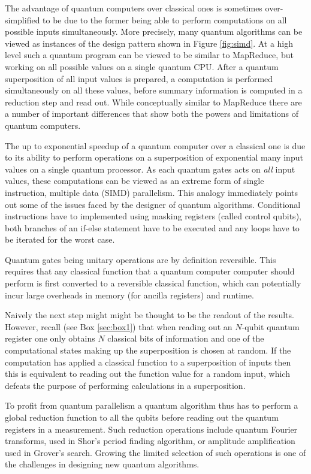 \documentclass[journal]{IEEEtran}
\begin{document}
The advantage of quantum computers over classical ones is sometimes over-simplified to be due to the former being able to perform computations on all possible inputs simultaneously. More precisely, many quantum algorithms can be viewed as instances of the design pattern shown in Figure \ref{fig:simd}. At a high level such a quantum program can be viewed to be similar to MapReduce, but working on all possible values on a single quantum CPU. After a quantum superposition of all input values is prepared, a computation is performed simultaneously on all these values, before summary information is computed in a reduction step and read out. 
While conceptually similar to MapReduce there are a number of important differences that show both the powers and limitations of quantum computers.

The up to exponential speedup of a quantum computer over a classical one is due to its ability to perform operations on a superposition of exponential many input values on a single quantum processor. As each quantum gates acts on {\em all} input values, these computations can be viewed as an extreme form of single instruction, multiple data (SIMD) parallelism. This analogy immediately points out some of the issues faced by the designer of quantum algorithms. Conditional instructions have to implemented using masking registers (called control qubits), both branches of an if-else statement have to be executed and any loops have to be iterated for the worst case.

Quantum gates being unitary operations are by definition reversible. This requires that any classical function that a quantum computer computer should perform is first converted to a reversible classical function, which can potentially incur large overheads in memory (for ancilla registers) and runtime.

Naively the next step might might be thought to be the readout of the results. However, recall (see Box \ref{sec:box1}) that when reading out an $N$-qubit quantum register one only obtains $N$ classical bits of information and one of the computational states making up the superposition is chosen at random. If the computation has applied a classical function to a superposition of inputs then this is  equivalent to reading out the function value for a random input, which defeats the purpose of performing calculations in a superposition. 

To profit from quantum parallelism a quantum algorithm thus has to perform a global reduction function to all the qubits before reading out the quantum registers in a measurement. Such reduction operations include quantum Fourier transforms, used in Shor's period finding algorithm, or amplitude amplification used in Grover's search. Growing the limited selection of such operations is one of the challenges in designing new quantum algorithms.
\end{document}
